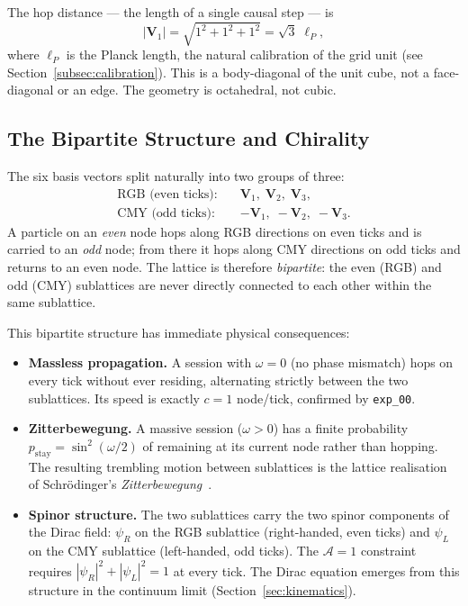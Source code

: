The hop distance --- the length of a single causal step --- is
\begin{equation}
    |\mathbf{V}_1| = \sqrt{1^2 + 1^2 + 1^2} = \sqrt{3}\;\ell_P,
    \label{eq:hop_distance}
\end{equation}
where $\ell_P$ is the Planck length, the natural calibration of the grid unit
(see Section~\ref{subsec:calibration}).
This is a body-diagonal of the unit cube, not a face-diagonal or an edge.
The geometry is octahedral, not cubic.

\subsection{The Bipartite Structure and Chirality}
\label{subsec:bipartite}

The six basis vectors split naturally into two groups of three:
\begin{align}
    \text{RGB (even ticks):}\quad &\mathbf{V}_1,\;\mathbf{V}_2,\;\mathbf{V}_3,
    \label{eq:rgb}\\
    \text{CMY (odd ticks):}\quad  &-\mathbf{V}_1,\;-\mathbf{V}_2,\;-\mathbf{V}_3.
    \label{eq:cmy}
\end{align}
A particle on an \emph{even} node hops along RGB directions on even ticks and
is carried to an \emph{odd} node; from there it hops along CMY directions on
odd ticks and returns to an even node.
The lattice is therefore \emph{bipartite}: the even (RGB) and odd (CMY)
sublattices are never directly connected to each other within the same sublattice.

This bipartite structure has immediate physical consequences:

\begin{itemize}
\item \textbf{Massless propagation.}
A session with $\omega = 0$ (no phase mismatch) hops on every tick without
ever residing, alternating strictly between the two sublattices.
Its speed is exactly $c = 1$ node/tick, confirmed by \texttt{exp\_00}.

\item \textbf{Zitterbewegung.}
A massive session ($\omega > 0$) has a finite probability $p_\mathrm{stay} =
\sin^2(\omega/2)$ of remaining at its current node rather than hopping.
The resulting trembling motion between sublattices is the lattice realisation
of Schr\"odinger's \emph{Zitterbewegung}~\cite{schrodinger1930}.

\item \textbf{Spinor structure.}
The two sublattices carry the two spinor components of the Dirac field:
$\psi_R$ on the RGB sublattice (right-handed, even ticks) and $\psi_L$
on the CMY sublattice (left-handed, odd ticks).
The $\mathcal{A}=1$ constraint requires
$|\psi_R|^2 + |\psi_L|^2 = 1$ at every tick.
The Dirac equation emerges from this structure in the continuum limit
(Section~\ref{sec:kinematics}).
\end{itemize}


